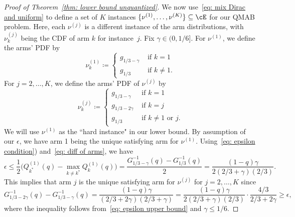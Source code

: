 \begin{proof}[Proof of Theorem~\ref{thm: lower bound unquantized}]
We now use~\eqref{eq: mix Dirac and uniform} to define a set of $K$ instances $\{\nu^{(1)}, \ldots, \nu^{(K)} \} \subseteq \cE$ for our QMAB problem. Here, 
each $\nu^{(j)}$ is a different instance of the arm distributions, with $\nu^{(j)}_k$ being the CDF of arm $k$ for instance~$j$.
Fix $\gamma \in (0,  1/6]$.
For $\nu^{(1)}$, we define the arms' PDF by
\begin{equation}
\label{eq: bad instance}
    \nu^{(1)}_k \coloneqq
    \begin{cases}
        g_{1/3- \gamma} & \text{ if } k = 1 \\
        g_{1/3} & \text{ if } k \ne 1.
    \end{cases}
\end{equation}
For $j = 2, \ldots, K$, we define the arms' PDF of $\nu^{(j)}$ by
\begin{equation}
    \nu^{(j)}_k  \coloneqq
    \begin{cases}
        g_{1/3- \gamma} & \text{ if } k = 1 \\
        g_{1/3- 2\gamma} & \text{ if } k = j \\
        g_{1/3} & \text{ if } k \ne 1 \text{ or } j.
    \end{cases}
\end{equation}
We will use $\nu^{(1)}$ as the ``hard instance" in our lower bound.
By assumption of our $\epsilon$, we have arm 1 being the unique satisfying arm for $\nu^{(1)}$. Using~\eqref{eq: epsilon condition}) and~\eqref{eq: diff of arms}, we have
\begin{equation}
\label{eq: epsilon upper bound}
    \epsilon  \le
    \frac{1}{2} \Big( Q^{(1)}_{k^*}(q) - \max \limits_{k \ne k^*} Q^{(1)}_k(q) \Big)
    = \frac{G^{-1}_{1/3 -\gamma}(q) - G^{-1}_{1/3}(q) }{2 } = 
    \frac{(1-q)\gamma}{2(2/3 + \gamma )(2/3)}.
\end{equation}
This implies that arm $j$ is the unique satisfying arm for $\nu^{(j)}$ for $j = 2, \ldots, K$ since
\begin{equation}
    G^{-1}_{1/3 -2\gamma}(q) - G^{-1}_{1/3-\gamma}(q)  = 
    \frac{(1-q)\gamma}{(2/3 + 2\gamma )(2/3 + \gamma)}
    =
    \frac{(1-q)\gamma}{2(2/3 + \gamma )(2/3)} \cdot
    \frac{4/3}{2/3 + 2\gamma}
    \ge \epsilon,
\end{equation}
where the inequality follows from~\eqref{eq: epsilon upper bound} and $\gamma \le 1/6$.



\end{proof}
